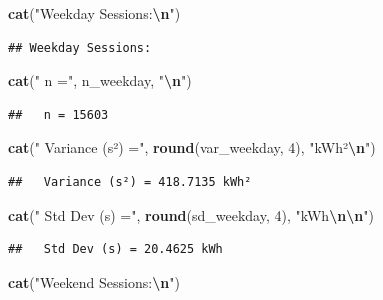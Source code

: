 \documentclass[
  12pt,
]{article}
\newenvironment{Shaded}{\begin{snugshade}}{\end{snugshade}}
\newcommand{\DecValTok}[1]{\textcolor[rgb]{0.00,0.00,0.81}{#1}}
\newcommand{\FunctionTok}[1]{\textcolor[rgb]{0.13,0.29,0.53}{\textbf{#1}}}
\newcommand{\NormalTok}[1]{#1}
\newcommand{\SpecialCharTok}[1]{\textcolor[rgb]{0.81,0.36,0.00}{\textbf{#1}}}
\newcommand{\StringTok}[1]{\textcolor[rgb]{0.31,0.60,0.02}{#1}}
\begin{document}
\begin{Shaded}
\begin{Highlighting}[]
\FunctionTok{cat}\NormalTok{(}\StringTok{"Weekday Sessions:}\SpecialCharTok{\textbackslash{}n}\StringTok{"}\NormalTok{)}
\end{Highlighting}
\end{Shaded}

\begin{verbatim}
## Weekday Sessions:
\end{verbatim}

\begin{Shaded}
\begin{Highlighting}[]
\FunctionTok{cat}\NormalTok{(}\StringTok{"  n ="}\NormalTok{, n\_weekday, }\StringTok{"}\SpecialCharTok{\textbackslash{}n}\StringTok{"}\NormalTok{)}
\end{Highlighting}
\end{Shaded}

\begin{verbatim}
##   n = 15603
\end{verbatim}

\begin{Shaded}
\begin{Highlighting}[]
\FunctionTok{cat}\NormalTok{(}\StringTok{"  Variance (s²) ="}\NormalTok{, }\FunctionTok{round}\NormalTok{(var\_weekday, }\DecValTok{4}\NormalTok{), }\StringTok{"kWh²}\SpecialCharTok{\textbackslash{}n}\StringTok{"}\NormalTok{)}
\end{Highlighting}
\end{Shaded}

\begin{verbatim}
##   Variance (s²) = 418.7135 kWh²
\end{verbatim}

\begin{Shaded}
\begin{Highlighting}[]
\FunctionTok{cat}\NormalTok{(}\StringTok{"  Std Dev (s) ="}\NormalTok{, }\FunctionTok{round}\NormalTok{(sd\_weekday, }\DecValTok{4}\NormalTok{), }\StringTok{"kWh}\SpecialCharTok{\textbackslash{}n\textbackslash{}n}\StringTok{"}\NormalTok{)}
\end{Highlighting}
\end{Shaded}

\begin{verbatim}
##   Std Dev (s) = 20.4625 kWh
\end{verbatim}

\begin{Shaded}
\begin{Highlighting}[]
\FunctionTok{cat}\NormalTok{(}\StringTok{"Weekend Sessions:}\SpecialCharTok{\textbackslash{}n}\StringTok{"}\NormalTok{)}
\end{Highlighting}
\end{Shaded}
\end{document}
